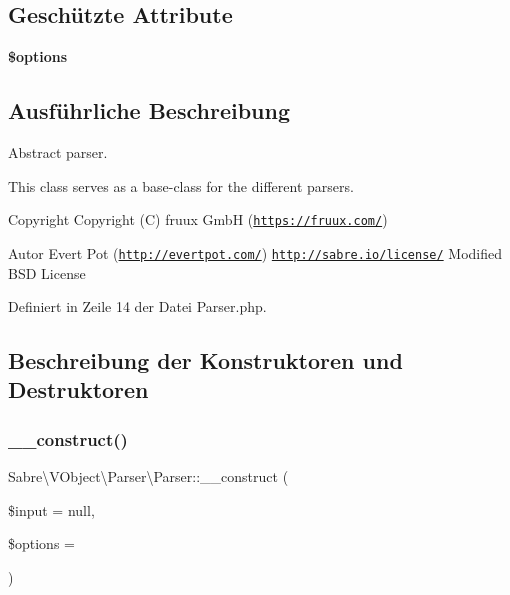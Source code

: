 \subsection*{Geschützte Attribute}
\begin{DoxyCompactItemize}
\item 
\mbox{\label{class_sabre_1_1_v_object_1_1_parser_1_1_parser_aed1ab8447dd8a009495130cbb97b47d3}} 
{\bfseries \$options}
\end{DoxyCompactItemize}


\subsection{Ausführliche Beschreibung}
Abstract parser.

This class serves as a base-\/class for the different parsers.

\begin{DoxyCopyright}{Copyright}
Copyright (C) fruux GmbH (\href{https://fruux.com/}{\tt https\+://fruux.\+com/}) 
\end{DoxyCopyright}
\begin{DoxyAuthor}{Autor}
Evert Pot (\href{http://evertpot.com/}{\tt http\+://evertpot.\+com/})  \href{http://sabre.io/license/}{\tt http\+://sabre.\+io/license/} Modified B\+SD License 
\end{DoxyAuthor}


Definiert in Zeile 14 der Datei Parser.\+php.



\subsection{Beschreibung der Konstruktoren und Destruktoren}
\mbox{\label{class_sabre_1_1_v_object_1_1_parser_1_1_parser_ac9049e290f06a8101961b1b52e0145b3}} 
\subsubsection{\texorpdfstring{\+\_\+\+\_\+construct()}{\_\_construct()}}
{\footnotesize\ttfamily Sabre\textbackslash{}\+V\+Object\textbackslash{}\+Parser\textbackslash{}\+Parser\+::\+\_\+\+\_\+construct (\begin{DoxyParamCaption}\item[{}]{\$input = {\ttfamily null},  }\item[{}]{\$options = {} }\end{DoxyParamCaption})}

